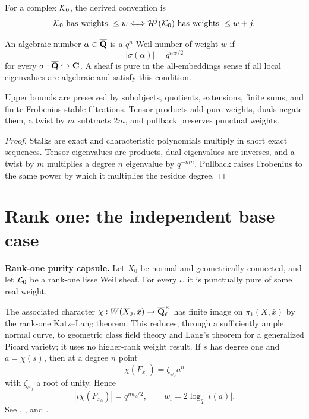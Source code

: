 For a complex \(\mathcal K_0\), the derived convention is
\[
 \mathcal K_0\text{ has weights }\le w
 \Longleftrightarrow
 \mathcal H^j(\mathcal K_0)\text{ has weights }\le w+j.
\]

\begin{definition}
\label{def:all-embedding-purity}
An algebraic number \(\alpha\in\overline{\mathbf Q}\) is a \(q^n\)-Weil number of
weight \(w\) if
\[
 |\sigma(\alpha)|=q^{nw/2}
\]
for every \(\sigma:\overline{\mathbf Q}\hookrightarrow\mathbf C\).  A sheaf is pure
in the all-embeddings sense if all local eigenvalues are algebraic and
satisfy this condition.
\end{definition}

\begin{proposition}
\label{prop:elementary-weight-permanence}
Upper bounds are preserved by subobjects, quotients, extensions, finite
sums, and finite Frobenius-stable filtrations.  Tensor products add pure
weights, duals negate them, a twist by \(m\) subtracts \(2m\), and
pullback preserves punctual weights.
\end{proposition}

\begin{proof}
Stalks are exact and characteristic polynomials multiply in short exact
sequences.  Tensor eigenvalues are products, dual eigenvalues are
inverses, and a twist by \(m\) multiplies a degree \(n\) eigenvalue by
\(q^{-mn}\).  Pullback raises Frobenius to the same power by which it
multiplies the residue degree.
\end{proof}

\section{Rank one: the independent base case}

\begin{foundation}
\label{found:rank-one-purity}
\textbf{Rank-one purity capsule.}
Let \(X_0\) be normal and geometrically connected, and let \(\mathcal L_0\) be
a rank-one lisse Weil sheaf.  For every \(\iota\), it is punctually pure
of some real weight.

The associated character
\(\chi:W(X_0,\bar x)\to\overline{\mathbf Q}_\ell^\times\) has finite image on
\(\pi_1(X,\bar x)\) by the rank-one Katz--Lang theorem.  This reduces,
through a sufficiently ample normal curve, to geometric class field
theory and Lang's theorem for a generalized Picard variety; it uses no
higher-rank weight result.  If \(s\) has degree one and \(a=\chi(s)\),
then at a degree \(n\) point
\[
 \chi(F_{x_0})=\zeta_{x_0}a^n
\]
with \(\zeta_{x_0}\) a root of unity.  Hence
\[
 |\iota\chi(F_{x_0})|
 =q^{nw_\iota/2},
 \qquad
 w_\iota=2\log_q|\iota(a)|.
\]
See \cite[Section~1.3]{DeligneWeilII},
\cite[Chapter~I]{KiehlWeissauer}, and
\cite{StanfordL19,StanfordL22}.
\end{foundation}


